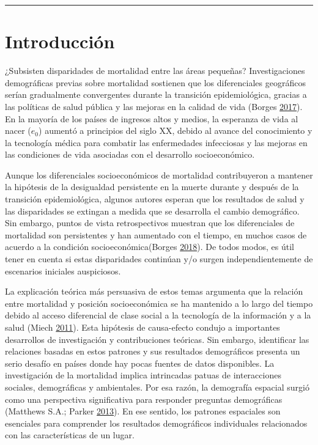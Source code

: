 \documentclass[12pt,]{article}
\begin{document}
\begin{center}\rule{0.5\linewidth}{0.5pt}\end{center}

\hypertarget{introducciuxf3n}{%
\section{Introducción}\label{introducciuxf3n}}

¿Subsisten disparidades de mortalidad entre las áreas pequeñas?
Investigaciones demográficas previas sobre mortalidad sostienen que los
diferenciales geográficos serían gradualmente convergentes durante la
transición epidemiológica, gracias a las políticas de salud pública y
las mejoras en la calidad de vida (Borges
\protect\hyperlink{ref-Borges2017}{2017}). En la mayoría de los países
de ingresos altos y medios, la esperanza de vida al nacer (\(e_0\))
aumentó a principios del siglo XX, debido al avance del conocimiento y
la tecnología médica para combatir las enfermedades infecciosas y las
mejoras en las condiciones de vida asociadas con el desarrollo
socioeconómico.

Aunque los diferenciales socioeconómicos de mortalidad contribuyeron a
mantener la hipótesis de la desigualdad persistente en la muerte durante
y después de la transición epidemiológica, algunos autores esperan que
los resultados de salud y las disparidades se extingan a medida que se
desarrolla el cambio demográfico. Sin embargo, puntos de vista
retrospectivos muestran que los diferenciales de mortalidad son
persistentes y han aumentado con el tiempo, en muchos casos de acuerdo a
la condición socioeconómica(Borges
\protect\hyperlink{ref-Borges2018}{2018}). De todos modos, es útil tener
en cuenta si estas disparidades continúan y/o surgen independientemente
de escenarios iniciales auspiciosos.

La explicación teórica más persuasiva de estos temas argumenta que la
relación entre mortalidad y posición socioeconómica se ha mantenido a lo
largo del tiempo debido al acceso diferencial de clase social a la
tecnología de la información y a la salud (Miech
\protect\hyperlink{ref-Miech2011}{2011}). Esta hipótesis de causa-efecto
condujo a importantes desarrollos de investigación y contribuciones
teóricas. Sin embargo, identificar las relaciones basadas en estos
patrones y sus resultados demográficos presenta un serio desafío en
países donde hay pocas fuentes de datos disponibles. La investigación de
la mortalidad implica intrincadas patuas de interacciones sociales,
demográficas y ambientales. Por esa razón, la demografía espacial surgió
como una perspectiva significativa para responder preguntas demográficas
(Matthews S.A.; Parker \protect\hyperlink{ref-Matthews2013}{2013}). En
ese sentido, los patrones espaciales son esenciales para comprender los
resultados demográficos individuales relacionados con las
características de un lugar.
\end{document}

